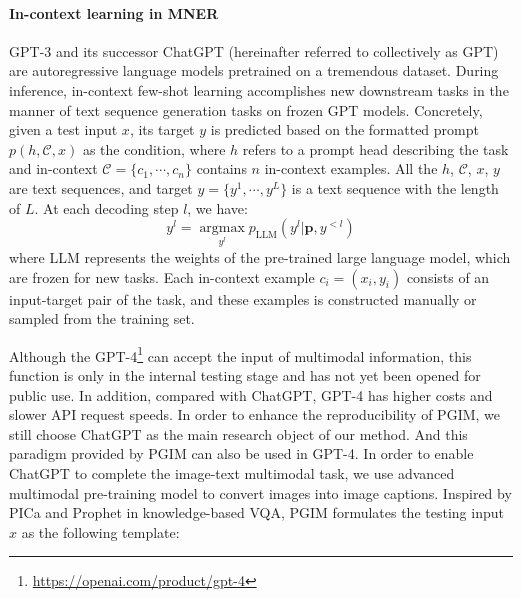 \documentclass[11pt]{article}
\begin{document}
\paragraph{In-context learning in MNER}
GPT-3 and its successor ChatGPT (hereinafter referred to collectively as GPT) are autoregressive language models pretrained on a tremendous dataset. During inference, in-context few-shot learning accomplishes new downstream tasks in the manner of text sequence generation tasks on frozen GPT models. Concretely, given a test input $x$, its target $y$ is predicted based on the formatted prompt $p (h, \mathcal{C}, x)$ as the condition, where $h$ refers to a prompt head describing the task and in-context $\mathcal{C} = \{c_1, \cdots, c_n\}$ contains $n$ in-context examples. 
All the $h$, $\mathcal{C}$, $x$, $y$ are text sequences, and target $y = \{y^1, \cdots, y^L\} $ is a text sequence with the length of $L$. At each decoding step $l$, we have:
\begin{equation}
	y^l = \mathop{\text{argmax}}\limits_{y^l} p_\textrm{LLM}(y^l|\boldsymbol{p}, y^{<l})  \nonumber
\end{equation}
where LLM represents the weights of the pre-trained large language model, which are frozen for new tasks. Each in-context example $c_i = (x_i, y_i)$ consists of an input-target pair of the task, and these examples is constructed manually or sampled from the training set.
 
Although the GPT-4\footnote{\url{https://openai.com/product/gpt-4}} can accept the input of multimodal information, this function is only in the internal testing stage and has not yet been opened for public use. In addition, compared with ChatGPT, GPT-4 has higher costs and slower API request speeds. In order to enhance the reproducibility of PGIM, we still choose ChatGPT as the main research object of our method. 
And this paradigm provided by PGIM can also be used in GPT-4. 
In order to enable ChatGPT to complete the image-text multimodal task, we use advanced multimodal pre-training model to convert images into image captions. Inspired by PICa \citep{yang2022empirical} and Prophet \citep{shao2023prompting} in knowledge-based VQA, PGIM formulates the testing input $x$ as the following template:
\end{document}
